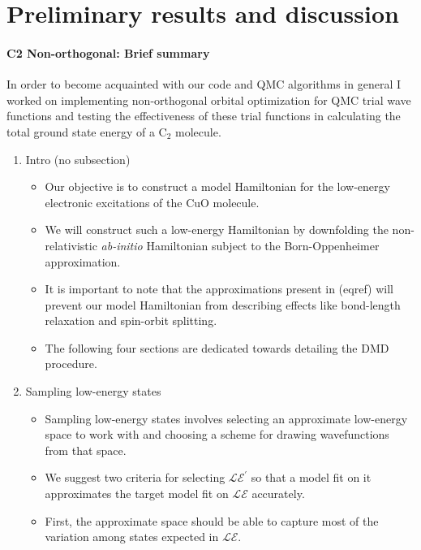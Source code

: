 \documentclass{article}
\begin{document}
\section{Preliminary results and discussion}
\paragraph{C2 Non-orthogonal: Brief summary} In order to become acquainted with our code and QMC algorithms in general I worked on implementing non-orthogonal orbital optimization for QMC trial wave functions and testing the effectiveness of these trial functions in calculating the total ground state energy of a C$_2$ molecule.

\begin{enumerate}
\item Intro (no subsection)
\begin{itemize}
\item Our objective is to construct a model Hamiltonian for the low-energy electronic excitations of the CuO molecule.

\item We will construct such a low-energy Hamiltonian by downfolding the non-relativistic \textit{ab-initio} Hamiltonian subject to the Born-Oppenheimer approximation.

\item It is important to note that the approximations present in (eqref) will prevent our model Hamiltonian from describing effects like bond-length relaxation and spin-orbit splitting.

\item The following four sections are dedicated towards detailing the DMD procedure.
\end{itemize}

\item Sampling low-energy states
\begin{itemize}
\item Sampling low-energy states involves selecting an approximate low-energy space to work with and choosing a scheme for drawing wavefunctions from that space.

\item We suggest two criteria for selecting $\mathcal{LE}^\prime$ so that a model fit on it approximates the target model fit on $\mathcal{LE}$ accurately.

\item First, the approximate space should be able to capture most of the variation among states expected in $\mathcal{LE}$.


\end{itemize}
\end{enumerate}
\end{document}
